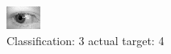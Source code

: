 \begin{figure}[h!]
\begin{center}
\includegraphics[width=0.60\columnwidth]{figures/ID770_class_3_target_4.png}
\end{center}
\caption{ Classification: 3 actual target: 4}
\label{fig:ID770_class_3_target_4}
\end{figure}
